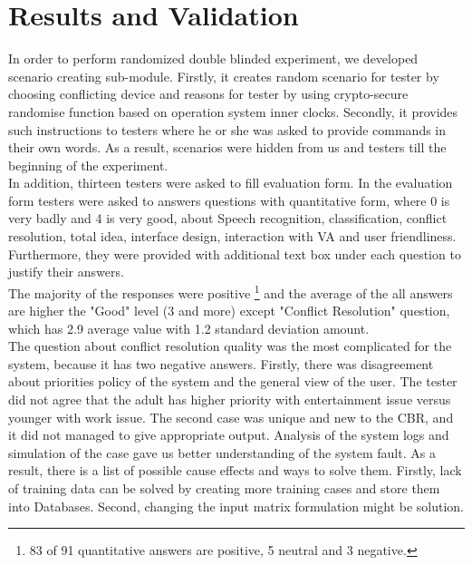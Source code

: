 \documentclass{llncs}
\begin{document}
    \section{Results and Validation}
    In order to perform randomized double
    blinded experiment, we developed scenario creating sub-module.
    Firstly, it creates random scenario for tester by choosing
    conflicting device and reasons for tester by using crypto-secure randomise function based on operation system inner
    clocks.
    Secondly, it provides such instructions to testers where he or she was
    asked to provide commands in their own words.
    As a result, scenarios were hidden from us and testers till
    the beginning of the experiment.\\
    In addition, thirteen testers were asked to fill evaluation form.
    In the evaluation form testers were asked to answers questions with quantitative form, where 0 is very badly and 4 is very good, about Speech recognition,
    classification, conflict resolution, total idea, interface design, interaction with VA and user friendliness.
    Furthermore, they were provided with additional text box under each question to justify their answers.\\
    The majority of the responses were positive \footnote{83 of 91 quantitative answers are positive, 5 neutral and 3 negative.}
    and the average of the all answers are higher the "Good" level (3 and more) except "Conflict Resolution" question, which
    has 2.9 average value with 1.2 standard deviation amount.\\
    The question about conflict resolution quality was the most complicated for the system, because it has two negative answers.
    Firstly, there was disagreement about priorities policy of the system and the general view of the user.
    The tester did not agree that the adult has higher priority with entertainment issue versus younger with work issue.
    The second case was unique and new to the CBR, and it did not managed to give appropriate output.
    Analysis of the system logs and simulation of the case gave us better understanding of the system fault.
    As a result, there is a list of possible cause effects and ways to solve them.
    Firstly, lack of training data can be solved by creating more training cases and store them into Databases.
    Second, changing the input matrix formulation might be solution.\\
\end{document}
